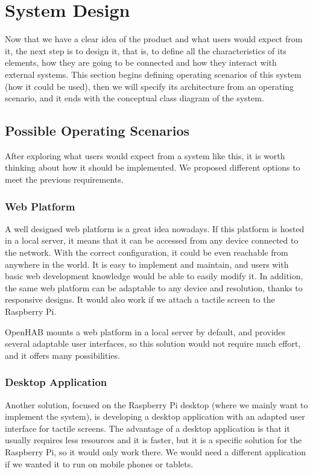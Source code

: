 \bigskip
\section{System Design}
Now that we have a clear idea of the product and what users would expect from it, the next step is to design it, that is, to define 
all the characteristics of its elements, how they are going to be connected and how they interact with external systems. This section 
begins defining operating scenarios of this system (how it could be used), then we will specify its architecture from an operating 
scenario, and it ends with the conceptual class diagram of the system.

\subsection{Possible Operating Scenarios}
After exploring what users would expect from a system like this, it is worth thinking about how it should be implemented. We proposed
different options to meet the previous requirements.

\subsubsection{Web Platform}
A well designed web platform is a great idea nowadays. If this platform is hosted in a local server, it means that it can be accessed
from any device connected to the network. With the correct configuration, it could be even reachable from anywhere in the world.
It is easy to implement and maintain, and users with basic web development knowledge would be able to easily modify it. In addition,
the same web platform can be adaptable to any device and resolution, thanks to responsive designs. It would also work if we attach
a tactile screen to the Raspberry Pi.

OpenHAB mounts a web platform in a local server by default, and provides several adaptable user interfaces, so this solution would
not require much effort, and it offers many possibilities.

\subsubsection{Desktop Application}
Another solution, focused on the Raspberry Pi desktop (where we mainly want to implement the system), is developing a desktop
application with an adapted user interface for tactile screens. The advantage of a desktop application is that it usually requires
less resources and it is faster, but it is a specific solution for the Raspberry Pi, so it would only work there. We would need a
different application if we wanted it to run on mobile phones or tablets.

